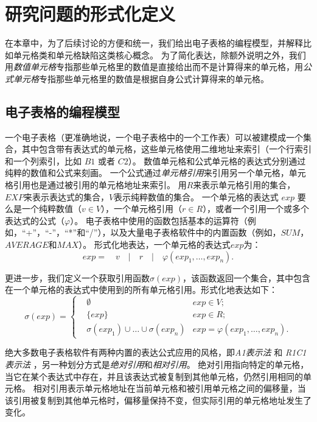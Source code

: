 \chapter{研究问题的形式化定义}

在本章中，为了后续讨论的方便和统一，我们给出电子表格的编程模型，并解释比如单元格类和单元格缺陷这类核心概念。
为了简化表达，除额外说明之外，我们用\textit{数值单元格}专指那些单元格里的数值是直接给出而不是计算得来的单元格，用\textit{公式单元格}专指那些单元格里的数值是根据自身公式计算得来的单元格。

\section{电子表格的编程模型}

一个电子表格（更准确地说，一个电子表格中的一个工作表）可以被建模成一个集合，其中包含带有表达式的单元格，这些单元格使用二维地址来索引（一个行索引和一个列索引，比如 $B1$ 或者 $C2$）。
数值单元格和公式单元格的表达式分别通过纯粹的数值和公式来刻画。
一个公式通过\textit{单元格引用}来引用另一个单元格，单元格引用也是通过被引用的单元格地址来索引。
用$R$来表示单元格引用的集合，$EXP$来表示表达式的集合，$V$表示纯粹数值的集合。
一个单元格的表达式 $exp$ 要么是一个纯粹数值（$v \in V$），一个单元格引用（$r \in R$），或者一个引用一个或多个表达式的公式（$\varphi $）。
电子表格中使用的函数包括基本的运算符（例如，“+”，“-”，“*”和“/”），以及大量电子表格软件中的内置函数（例如，$SUM$，$AVERAGE$和$MAX$）。
形式化地表达，一个单元格的表达式$exp$为：
\[ exp =\quad v\quad |\quad r\quad |\quad \varphi (exp_1,\dots,exp_n). \]

更进一步，我们定义一个获取引用函数$\sigma(exp)$，该函数返回一个集合，其中包含在一个单元格的表达式中使用到的所有单元格引用。形式化地表达如下：
$$
\sigma(exp) = 
\left\{
    \begin{aligned}
       & \emptyset & exp \in V; \\
       & \{exp\}     & exp \in R; \\
       & \sigma(exp_1) \cup \dots \cup \sigma(exp_n) & exp = \varphi(exp_1, \dots , exp_n).
    \end{aligned}
\right.
$$




绝大多数电子表格软件有两种内置的表达公式应用的风格，即\textit{A1表示法} 和 \textit{R1C1表示法} \cite{tan2014bug} ，另一种划分方式是\textit{绝对引用}和\textit{相对引用}。
绝对引用指向特定的单元格，当它在某个表达式中存在，并且该表达式被复制到其他单元格，仍然引用相同的单元格。
相对引用表示单元格地址在当前单元格和被引用单元格之间的偏移量，当该引用被复制到其他单元格时，偏移量保持不变，但实际引用的单元格地址发生了变化。

